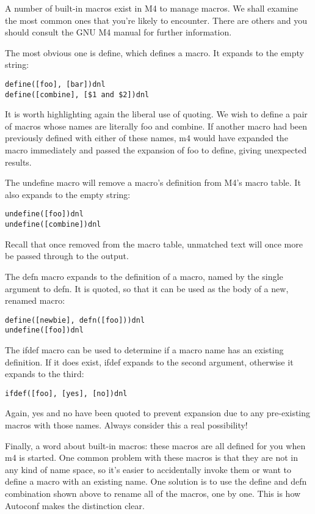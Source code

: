 A number of built-in macros exist in M4 to manage macros. We shall examine the most common ones that you're likely to encounter. There are others and you should consult the GNU M4 manual for further information.

The most obvious one is define, which defines a macro. It expands to the empty string: 

\begin{verbatim}
define([foo], [bar])dnl
define([combine], [$1 and $2])dnl
\end{verbatim}

It is worth highlighting again the liberal use of quoting. We wish to define a pair of macros whose names are literally foo and combine. If another macro had been previously defined with either of these names, m4 would have expanded the macro immediately and passed the expansion of foo to define, giving unexpected results.

The undefine macro will remove a macro's definition from M4's macro table. It also expands to the empty string: 

\begin{verbatim}
undefine([foo])dnl
undefine([combine])dnl
\end{verbatim}

Recall that once removed from the macro table, unmatched text will once more be passed through to the output.

The defn macro expands to the definition of a macro, named by the single argument to defn. It is quoted, so that it can be used as the body of a new, renamed macro:

 	

\begin{verbatim}
define([newbie], defn([foo]))dnl
undefine([foo])dnl
\end{verbatim}

The ifdef macro can be used to determine if a macro name has an existing definition. If it does exist, ifdef expands to the second argument, otherwise it expands to the third: 

\begin{verbatim}
ifdef([foo], [yes], [no])dnl
\end{verbatim}

Again, yes and no have been quoted to prevent expansion due to any pre-existing macros with those names. Always consider this a real possibility!

Finally, a word about built-in macros: these macros are all defined for you when m4 is started. One common problem with these macros is that they are not in any kind of name space, so it's easier to accidentally invoke them or want to define a macro with an existing name. One solution is to use the define and defn combination shown above to rename all of the macros, one by one. This is how Autoconf makes the distinction clear. 

